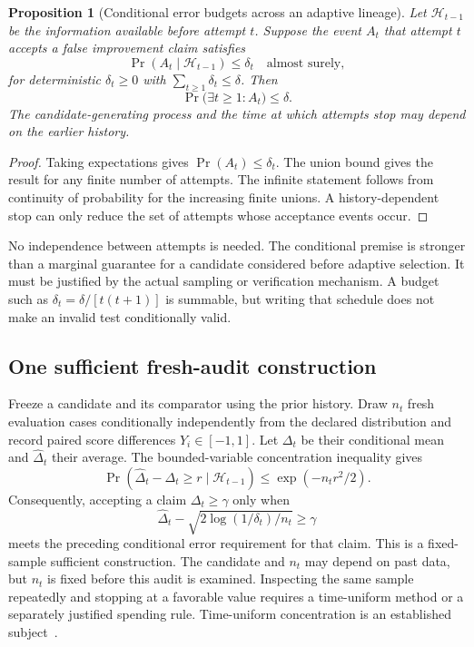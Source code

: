 \documentclass[11pt,letterpaper]{article}
\theoremstyle{plain}
\newtheorem{proposition}[theorem]{Proposition}
\theoremstyle{definition}
\begin{document}
\begin{proposition}[Conditional error budgets across an adaptive lineage]\label{prop:lineage}
Let $\mathcal H_{t-1}$ be the information available before attempt $t$. Suppose the event $A_t$ that attempt $t$ accepts a false improvement claim satisfies
\[
\Pr(A_t\mid\mathcal H_{t-1})\leq\delta_t
\quad\text{almost surely},
\]
for deterministic $\delta_t\geq0$ with $\sum_{t\geq1}\delta_t\leq\delta$. Then
\[
\Pr\big(\exists t\geq1:A_t\big)\leq\delta.
\]
The candidate-generating process and the time at which attempts stop may depend on the earlier history.
\end{proposition}
\begin{proof}
Taking expectations gives $\Pr(A_t)\leq\delta_t$. The union bound gives the result for any finite number of attempts. The infinite statement follows from continuity of probability for the increasing finite unions. A history-dependent stop can only reduce the set of attempts whose acceptance events occur.
\end{proof}

No independence between attempts is needed. The conditional premise is stronger than a marginal guarantee for a candidate considered before adaptive selection. It must be justified by the actual sampling or verification mechanism. A budget such as $\delta_t=\delta/[t(t+1)]$ is summable, but writing that schedule does not make an invalid test conditionally valid.

\subsection{One sufficient fresh-audit construction}
Freeze a candidate and its comparator using the prior history. Draw $n_t$ fresh evaluation cases conditionally independently from the declared distribution and record paired score differences $Y_i\in[-1,1]$. Let $\Delta_t$ be their conditional mean and $\widehat\Delta_t$ their average. The bounded-variable concentration inequality gives
\[
\Pr\left(\widehat\Delta_t-\Delta_t\geq r\mid\mathcal H_{t-1}\right)
\leq \exp(-n_tr^2/2).
\]
Consequently, accepting a claim $\Delta_t\geq\gamma$ only when
\begin{equation}\label{eq:audit}
\widehat\Delta_t-\sqrt{2\log(1/\delta_t)/n_t}\geq\gamma
\end{equation}
meets the preceding conditional error requirement for that claim. This is a fixed-sample sufficient construction. The candidate and $n_t$ may depend on past data, but $n_t$ is fixed before this audit is examined. Inspecting the same sample repeatedly and stopping at a favorable value requires a time-uniform method or a separately justified spending rule. Time-uniform concentration is an established subject~\cite{howard}.
\end{document}
